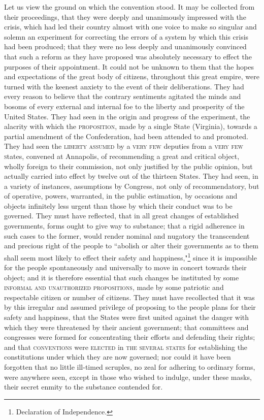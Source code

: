 Let us view the ground on which the convention stood. 
It may be collected from their proceedings, that they were deeply and unanimously impressed with the crisis, which had led their country almost with one voice to make so singular and solemn an experiment for correcting the errors of a system by which this crisis had been produced; that they were no less deeply and unanimously convinced that such a reform as they have proposed was absolutely necessary to effect the purposes of their appointment. 
It could not be unknown to them that the hopes and expectations of the great body of citizens, throughout this great empire, were turned with the keenest anxiety to the event of their deliberations. 
They had every reason to believe that the contrary sentiments agitated the minds and bosoms of every external and internal foe to the liberty and prosperity of the United States. 
They had seen in the origin and progress of the experiment, the alacrity with which the \textsc{proposition}, made by a single State (Virginia), towards a partial amendment of the Confederation, had been attended to and promoted. 
They had seen the \textsc{liberty assumed} by a \textsc{very few} deputies from a \textsc{very few s}tates, convened at Annapolis, of recommending a great and critical object, wholly foreign to their commission, not only justified by the public opinion, but actually carried into effect by twelve out of the thirteen States. 
They had seen, in a variety of instances, assumptions by Congress, not only of recommendatory, but of operative, powers, warranted, in the public estimation, by occasions and objects infinitely less urgent than those by which their conduct was to be governed. 
They must have reflected, that in all great changes of established governments, forms ought to give way to substance; that a rigid adherence in such cases to the former, would render nominal and nugatory the transcendent and precious right of the people to ``abolish or alter their governments as to them shall seem most likely to effect their safety and happiness,"\footnote{Declaration of Independence.} since it is impossible for the people spontaneously and universally to move in concert towards their object; and it is therefore essential that such changes be instituted by some \textsc{informal and unauthorized propositions}, made by some patriotic and respectable citizen or number of citizens. 
They must have recollected that it was by this irregular and assumed privilege of proposing to the people plans for their safety and happiness, that the States were first united against the danger with which they were threatened by their ancient government; that committees and congresses were formed for concentrating their efforts and defending their rights; and that \textsc{conventions} were \textsc{elected} in \textsc{the several states} for establishing the constitutions under which they are now governed; nor could it have been forgotten that no little ill-timed scruples, no zeal for adhering to ordinary forms, were anywhere seen, except in those who wished to indulge, under these masks, their secret enmity to the substance contended for. 
